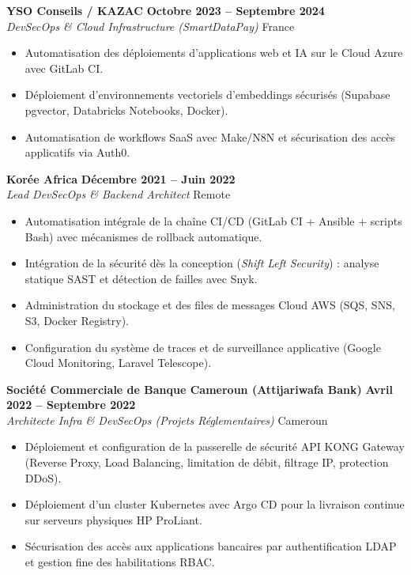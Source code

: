 \documentclass[10pt,a4paper]{article}
\begin{document}
\vspace{0.35em}

\textbf{\large YSO Conseils / KAZAC} \hfill {\bfseries\small\color{slateGray} Octobre 2023 -- Septembre 2024} \\
\emph{\color{primary}DevSecOps \& Cloud Infrastructure (SmartDataPay)} \hfill {\small France}
\begin{itemize}[leftmargin=1.4em, itemsep=0.18em, topsep=0.15em]
    \item Automatisation des déploiements d'applications web et IA sur le Cloud Azure avec GitLab CI.
    \item Déploiement d'environnements vectoriels d'embeddings sécurisés (Supabase pgvector, Databricks Notebooks, Docker).
    \item Automatisation de workflows SaaS avec Make/N8N et sécurisation des accès applicatifs via Auth0.
\end{itemize}

\newpage

\textbf{\large Korée Africa} \hfill {\bfseries\small\color{slateGray} Décembre 2021 -- Juin 2022} \\
\emph{\color{primary}Lead DevSecOps \& Backend Architect} \hfill {\small Remote}
\begin{itemize}[leftmargin=1.4em, itemsep=0.18em, topsep=0.15em]
    \item Automatisation intégrale de la chaîne CI/CD (GitLab CI + Ansible + scripts Bash) avec mécanismes de rollback automatique.
    \item Intégration de la sécurité dès la conception (\emph{Shift Left Security}) : analyse statique SAST et détection de failles avec Snyk.
    \item Administration du stockage et des files de messages Cloud AWS (SQS, SNS, S3, Docker Registry).
    \item Configuration du système de traces et de surveillance applicative (Google Cloud Monitoring, Laravel Telescope).
\end{itemize}

\vspace{0.4em}

\textbf{\large Société Commerciale de Banque Cameroun (Attijariwafa Bank)} \hfill {\bfseries\small\color{slateGray} Avril 2022 -- Septembre 2022} \\
\emph{\color{primary}Architecte Infra \& DevSecOps (Projets Réglementaires)} \hfill {\small Cameroun}
\begin{itemize}[leftmargin=1.4em, itemsep=0.18em, topsep=0.15em]
    \item Déploiement et configuration de la passerelle de sécurité API KONG Gateway (Reverse Proxy, Load Balancing, limitation de débit, filtrage IP, protection DDoS).
    \item Déploiement d'un cluster Kubernetes avec Argo CD pour la livraison continue sur serveurs physiques HP ProLiant.
    \item Sécurisation des accès aux applications bancaires par authentification LDAP et gestion fine des habilitations RBAC.
\end{itemize}
\end{document}
